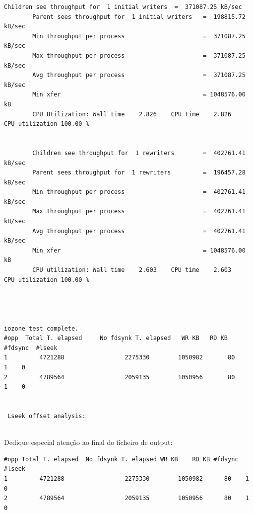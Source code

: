 \documentclass[a4paper]{article}
\begin{document}
{\begin{lstlisting}[style=output]
        Children see throughput for  1 initial writers  =  371087.25 kB/sec
        Parent sees throughput for  1 initial writers   =  198815.72 kB/sec
        Min throughput per process                      =  371087.25 kB/sec 
        Max throughput per process                      =  371087.25 kB/sec
        Avg throughput per process                      =  371087.25 kB/sec
        Min xfer                                        = 1048576.00 kB
        CPU Utilization: Wall time    2.826    CPU time    2.826    CPU utilization 100.00 %


        Children see throughput for  1 rewriters        =  402761.41 kB/sec
        Parent sees throughput for  1 rewriters         =  196457.28 kB/sec
        Min throughput per process                      =  402761.41 kB/sec 
        Max throughput per process                      =  402761.41 kB/sec
        Avg throughput per process                      =  402761.41 kB/sec
        Min xfer                                        = 1048576.00 kB
        CPU utilization: Wall time    2.603    CPU time    2.603    CPU utilization 100.00 %




iozone test complete.
#opp  Total T. elapsed     No fdsynk T. elapsed   WR KB   RD KB       #fdsync  #lseek
1         4721288                 2275330        1050982       80         1    0
2         4789564                 2059135        1050956       80         1    0


 Lseek offset analysis:


\end{lstlisting}

Dedique especial atenção ao final do ficheiro de output:

\begin{lstlisting}[style=command]
#opp Total T. elapsed  No fdsynk T. elapsed WR KB    RD KB #fdsync  #lseek
1         4721288                 2275330        1050982      80    1    0
2         4789564                 2059135        1050956      80    1    0
\end{lstlisting}



}
\end{document}
